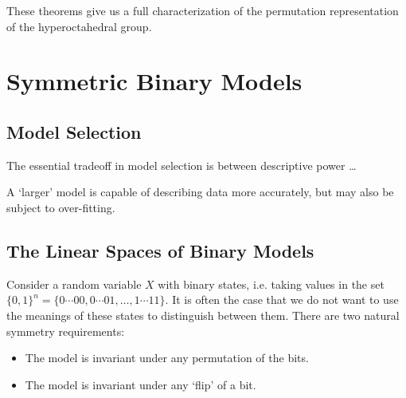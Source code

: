 \documentclass[cclicense]{hmcthesis}
\numberwithin{equation}{chapter}
\numberwithin{thmcounter}{chapter}
\begin{document}
    These theorems give us a full characterization of the permutation
    representation of the hyperoctahedral group.



\chapter{Symmetric Binary Models}

\section{Model Selection}
    The essential tradeoff in model selection is between descriptive power \ldots

    A `larger' model is capable of describing data more accurately, but may also be
    subject to over-fitting.

\section{The Linear Spaces of Binary Models}

    Consider a random variable $X$ with binary states, i.e. taking values in the
    set $\{0, 1\}^n = \{0\cdots00, 0\cdots01, \ldots, 1\cdots11\}$.  It is often
    the case that we do not want to use the meanings of these states to
    distinguish between them.  There are two natural symmetry requirements:
    \begin{itemize}\nospace
    \item The model is invariant under any permutation of the bits.
    \item The model is invariant under any `flip' of a bit.
    \end{itemize}
\end{document}
